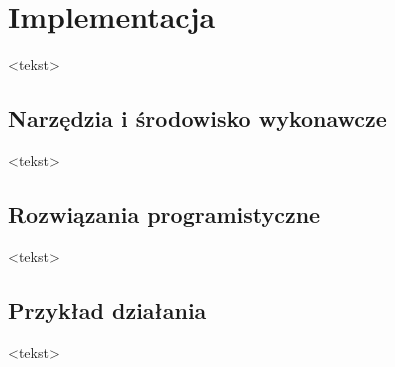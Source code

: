\chapter{Implementacja}

<tekst>


\section{Narzędzia i środowisko wykonawcze}

<tekst>


\section{Rozwiązania programistyczne}

<tekst>


\section{Przykład działania}

<tekst>
